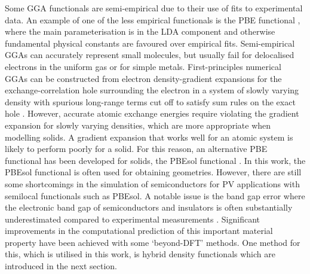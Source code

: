 \documentclass[11pt, twoside]{report}
\begin{document}
Some GGA functionals are semi-empirical due to their use of fits to experimental data. An example of one of the less empirical functionals is the PBE functional \cite{PBE}, where the main parameterisation is in the LDA component and otherwise fundamental physical constants are favoured over empirical fits.
Semi-empirical GGAs can accurately represent small molecules, but usually fail for delocalised electrons in the uniform gas or for simple metals. First-principles numerical GGAs can be constructed from electron density-gradient expansions for the exchange-correlation hole surrounding the electron in a system of slowly varying density with spurious long-range terms cut off to satisfy sum rules on the exact hole \cite{PBE}.
However, accurate atomic exchange energies require violating the gradient expansion for slowly varying densities, which are more appropriate when modelling solids. A gradient expansion that works well for an atomic system is likely to perform poorly for a solid. For this reason, an alternative PBE functional has been developed for solids, the PBEsol functional \cite{PBEsol}. In this work, the PBEsol functional is often used for obtaining geometries. However, there are still some shortcomings in the simulation of semiconductors for PV applications with semilocal functionals such as PBEsol. A notable issue is the band gap error where the electronic band gap of semiconductors and insulators is often substantially underestimated compared to experimental measurements \cite{band_gap_error}. Significant improvements in the computational prediction of this important material property have been achieved with some `beyond-DFT' methods. One method for this, which is utilised in this work, is hybrid density functionals which are introduced in the next section.


\end{document}
